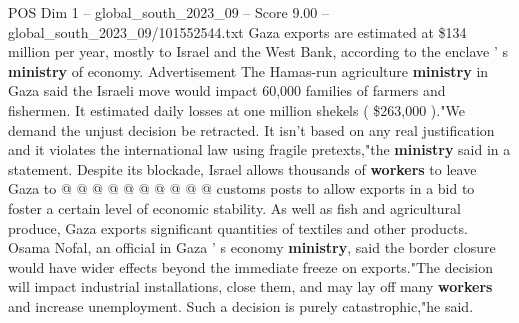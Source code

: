 \begin{textsample}{POS Dim 1 – global\_south\_2023\_09 – Score 9.00 – global\_south\_2023\_09/101552544.txt}
Gaza exports are estimated at \$134 million per year, mostly to Israel and the West Bank, according to the enclave ' s \textbf{ministry} of economy.
Advertisement The Hamas-run agriculture \textbf{ministry} in Gaza said the Israeli move would impact 60,000 families of farmers and fishermen.
It estimated daily losses at one million shekels ( \$263,000 )."We demand the unjust decision be retracted.
It isn't based on any real justification and it violates the international law using fragile pretexts,"the \textbf{ministry} said in a statement.
Despite its blockade, Israel allows thousands of \textbf{workers} to leave Gaza to @ @ @ @ @ @ @ @ @ @ customs posts to allow exports in a bid to foster a certain level of economic stability.
As well as fish and agricultural produce, Gaza exports significant quantities of textiles and other products.
Osama Nofal, an official in Gaza ' s economy \textbf{ministry}, said the border closure would have wider effects beyond the immediate freeze on exports."The decision will impact industrial installations, close them, and may lay off many \textbf{workers} and increase unemployment.
Such a decision is purely catastrophic,"he said.

\end{textsample}
